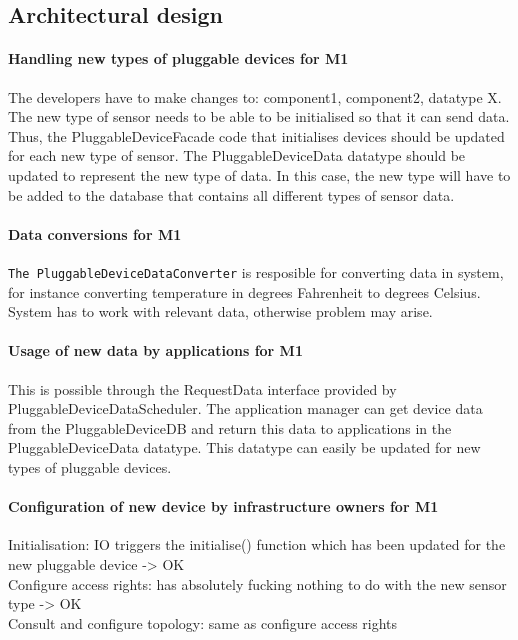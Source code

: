 \subsection{Architectural design}

    \paragraph{Handling new types of pluggable devices for M1}
        The developers have to make changes to: component1, component2, datatype X.
        The new type of sensor needs to be able to be initialised so that it can send data.
        Thus, the PluggableDeviceFacade code that initialises devices should be updated for
        each new type of sensor. The PluggableDeviceData datatype should be updated to
        represent the new type of data. In this case, the new type will have to be added
        to the database that contains all different types of sensor data.

    \paragraph{Data conversions for M1}
        \texttt{The PluggableDeviceDataConverter} is resposible for converting data 
         in system, for instance converting temperature in degrees Fahrenheit 
         to degrees Celsius. System has to work with relevant data, 
         otherwise problem may arise. 
         
    \paragraph{Usage of new data by applications for M1}
        This is possible through the RequestData interface provided by PluggableDeviceDataScheduler.
        The application manager can get device data from the PluggableDeviceDB and return this
        data to applications in the PluggableDeviceData datatype. This datatype can easily be
        updated for new types of pluggable devices.

    \paragraph{Configuration of new device by infrastructure owners for M1}
        Initialisation: IO triggers the initialise() function which has been
        updated for the new pluggable device -> OK\\
        Configure access rights: has absolutely fucking nothing to do with the
        new sensor type -> OK \\
        Consult and configure topology: same as configure access rights

